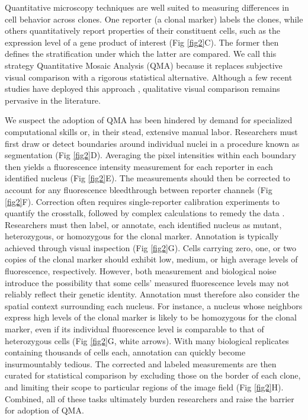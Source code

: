 \documentclass[10pt,letterpaper]{article}
\begin{document}
Quantitative microscopy techniques are well suited to measuring differences in cell behavior across clones. One reporter (a clonal marker) labels the clones, while others quantitatively report properties of their constituent cells, such as the expression level of a gene product of interest (Fig \ref{fig2}C). The former then defines the stratification under which the latter are compared. We call this strategy Quantitative Mosaic Analysis (QMA) because it replaces subjective visual comparison with a rigorous statistical alternative. Although a few recent studies have deployed this approach \cite{Dai2017,Bernasek2018,Ghiglione2018,Li2018}, qualitative visual comparison remains pervasive in the literature.

We suspect the adoption of QMA has been hindered by demand for specialized computational skills or, in their stead, extensive manual labor. Researchers must first draw or detect boundaries around individual nuclei in a procedure known as segmentation (Fig \ref{fig2}D). Averaging the pixel intensities within each boundary then yields a fluorescence intensity measurement for each reporter in each identified nucleus (Fig \ref{fig2}E). The measurements should then be corrected to account for any fluorescence bleedthrough between reporter channels (Fig \ref{fig2}F). Correction often requires single-reporter calibration experiments to quantify the crosstalk, followed by complex calculations to remedy the data \cite{Bacia2012,Elangovan2003}. Researchers must then label, or annotate, each identified nucleus as mutant, heterozygous, or homozygous for the clonal marker. Annotation is typically achieved through visual inspection (Fig \ref{fig2}G). Cells carrying zero, one, or two copies of the clonal marker should exhibit low, medium, or high average levels of fluorescence, respectively. However, both measurement and biological noise introduce the possibility that some cells’ measured fluorescence levels may not reliably reflect their genetic identity. Annotation must therefore also consider the spatial context surrounding each nucleus. For instance, a nucleus whose neighbors express high levels of the clonal marker is likely to be homozygous for the clonal marker, even if its individual fluorescence level is comparable to that of heterozygous cells (Fig \ref{fig2}G, white arrows). With many biological replicates containing thousands of cells each, annotation can quickly become insurmountably tedious. The corrected and labeled measurements are then curated for statistical comparison by excluding those on the border of each clone, and limiting their scope to particular regions of the image field (Fig \ref{fig2}H). Combined, all of these tasks ultimately burden researchers and raise the barrier for adoption of QMA. 
\end{document}
